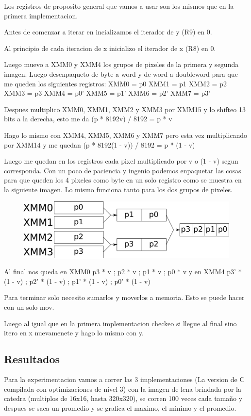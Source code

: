 Los registros de proposito general que vamos a usar son los mismos que en la primera implementacion.

Antes de comenzar a iterar en incializamos el iterador de y (R9) en 0.

Al principio de cada iteracion de x inicializo el iterador de x (R8) en 0.

Luego muevo a XMM0 y XMM4 los grupos de pixeles de la primera y segunda imagen. Luego desenpaqueto de byte a word y de word a doubleword para que me queden los siguientes registros:
	XMM0 = p0
	XMM1 = p1
	XMM2 = p2
	XMM3 = p3
	XMM4 = p0'
	XMM5 = p1'
	XMM6 = p2'
	XMM7 = p3'

Despues multiplico XMM0, XMM1, XMM2 y XMM3 por XMM15 y lo shifteo 13 bits a la derecha, esto me da (p * 8192v) / 8192 = p * v

Hago lo mismo con XMM4, XMM5, XMM6 y XMM7 pero esta vez multiplicando por XMM14 y me quedan (p * 8192(1 - v)) / 8192 = p * (1 - v)

Luego me quedan en los registros cada pixel multiplicado por v o (1 - v) segun corresponda. Con un poco de paciencia y ingenio podemos enpaquetar las cosas para que queden los 4 pixeles como byte en un solo registro como se muestra en la siguiente imagen. Lo mismo funciona tanto para los dos grupos de pixeles.

\begin{figure}[h!]
	\centering
	\includegraphics[scale=0.5]{images/MergeASM2_1}
\end{figure}

Al final nos queda en XMM0 p3 * v ; p2 * v ; p1 * v ; p0 * v y en XMM4 p3' * (1 - v) ; p2' * (1 - v) ; p1' * (1 - v) ; p0' * (1 - v)

Para terminar solo necesito sumarlos y moverlos a memoria. Esto se puede hacer con un solo mov.

Luego al igual que en la primera implementacion checkeo si llegue al final sino itero en x nuevamenete y hago lo mismo con y.

\subsection{Resultados}
Para la experimentacion vamos a correr las 3 implementaciones (La version de C compilada con optimizaciones de nivel 3) con la imagen de lena brindada por la catedra (multiplos de 16x16, hasta 320x320), se corren 100 veces cada tamaño y despues se saca un promedio y se grafica el maximo, el minimo y el promedio.

